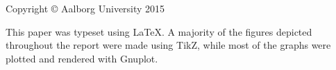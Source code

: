 \thispagestyle{empty}
{\small
\strut\vfill
\noindent Copyright \copyright{} Aalborg University 2015\par
\vspace{0.2cm}
\noindent This paper was typeset using \LaTeX. A majority of the figures depicted throughout the report were made using TikZ, while most of the graphs were plotted and rendered with Gnuplot. 
}
\clearpage